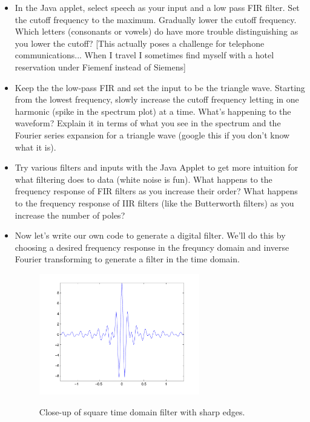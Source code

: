 \documentclass[prd,floatfix,preprintnumbers,amsmath,amssymb,nofootinbib,superscriptaddress]{revtex4}
\begin{document}
\begin{itemize}

\item In the Java applet, select speech as your input and a low pass FIR filter. 
Set the cutoff frequency to the maximum.  Gradually lower the cutoff frequency.  
Which letters (consonants or vowels) do have more trouble distinguishing as you lower the cutoff?
[This actually poses a challenge for telephone communications... When I travel I sometimes find 
myself with a hotel reservation under Fiemenf instead of Siemens]

\item Keep the the low-pass FIR and set the input to be the triangle wave. Starting from the lowest frequency, 
slowly increase the cutoff frequency letting in one harmonic (spike in the spectrum plot) at a time. 
What's happening to the waveform?  Explain it in terms of what you see in
the spectrum and the Fourier series expansion for a triangle wave (google this if you don't know what it is).

\item Try various filters and inputs with the Java Applet to get more intuition for 
what filtering does to data (white noise is fun).  What happens to the 
frequency response of FIR filters as you increase their order? What 
happens to the frequency response of IIR filters (like the Butterworth filters) 
as you increase the number of poles?

\item Now let's write our own code to generate a digital filter. We'll do this by 
choosing a desired frequency response in the frequncy domain and inverse Fourier transforming to generate a 
filter in the time domain.

\begin{figure}[h]
\includegraphics[width=7cm]{filter-square}\\
\caption{Close-up of square time domain filter with sharp edges.}
\end{figure}


\end{itemize}
\end{document}
